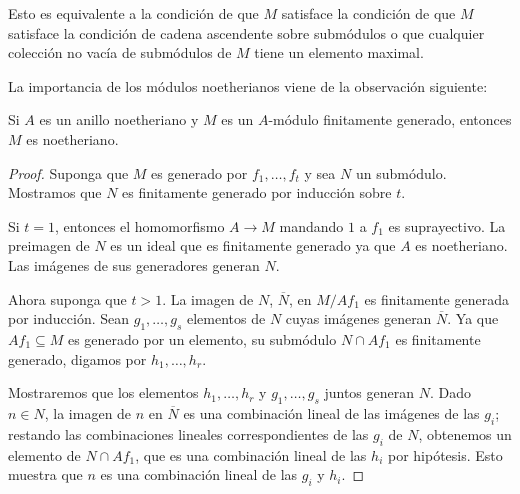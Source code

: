 Esto es equivalente a la condición de que $M$ satisface la condición de que $M$ satisface la condición de cadena ascendente sobre submódulos o que cualquier colección no vacía de submódulos de $M$ tiene un elemento maximal.

La importancia de los módulos noetherianos viene de la observación siguiente:

\begin{theorem}
  Si $A$ es un anillo noetheriano y $M$ es un $A$-módulo finitamente generado, entonces $M$ es noetheriano.
\end{theorem}
\begin{proof}
  Suponga que $M$ es generado por $f_1, \ldots, f_t$ y sea $N$ un submódulo. Mostramos que $N$ es finitamente generado por inducción sobre $t$.

  Si $t = 1$, entonces el homomorfismo $A \to M$ mandando $1$ a $f_1$ es suprayectivo. La preimagen de $N$ es un ideal que es finitamente generado ya que $A$ es noetheriano. Las imágenes de sus generadores generan $N$.

  Ahora suponga que $t>1$. La imagen de $N$, $\overline N$, en $M/Af_1$ es finitamente generada por inducción. Sean $g_1,\ldots,g_s$ elementos de $N$ cuyas imágenes generan $\overline N$. Ya que $Af_1 \subseteq M$ es generado por un elemento, su submódulo $N \cap Af_1$ es finitamente generado, digamos por $h_1,\ldots,h_r$.

  Mostraremos que los elementos $h_1,\ldots,h_r$ y $g_1,\ldots,g_s$ juntos generan $N$. Dado $n \in N$, la imagen de $n$ en $\overline N$ es una combinación lineal de las imágenes de las $g_i$; restando las combinaciones lineales correspondientes de las $g_i$ de $N$, obtenemos un elemento de $N \cap Af_1$, que es una combinación lineal de las $h_i$ por hipótesis. Esto muestra que $n$ es una combinación lineal de las $g_i$ y $h_i$.
\end{proof}

